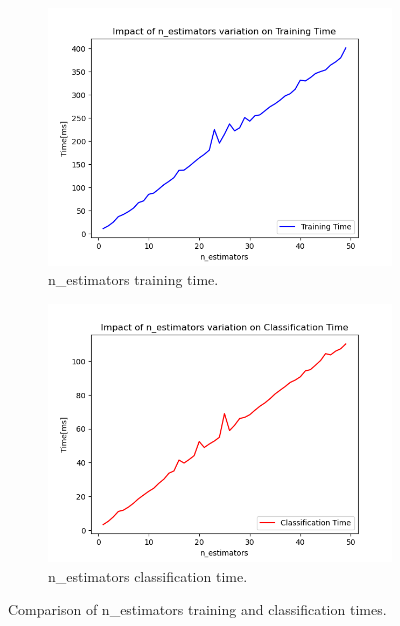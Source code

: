 \documentclass[futureinternet,article,submit,pdftex,moreauthors]{Definitions/mdpi}
\begin{document}
\begin{figure}[H]
    \centering
    \begin{subfigure}{0.49\textwidth}
        \centering
        \includegraphics[width=\textwidth]{img/nEstimatorsTrainingTime.png}
        \caption{n\_estimators training time.}
        \label{fig:n_estimators_training_time}
    \end{subfigure}
    \hfill
    \begin{subfigure}{0.49\textwidth}
        \centering
        \includegraphics[width=\textwidth]{img/nEstimatorsClassificationTime.png}
        \caption{n\_estimators classification time.}
        \label{fig:n_estimators_classification_time}
    \end{subfigure}
    \caption{Comparison of n\_estimators training and classification times.}
    \label{fig:estimators_time_comparison}
\end{figure}
\end{document}
